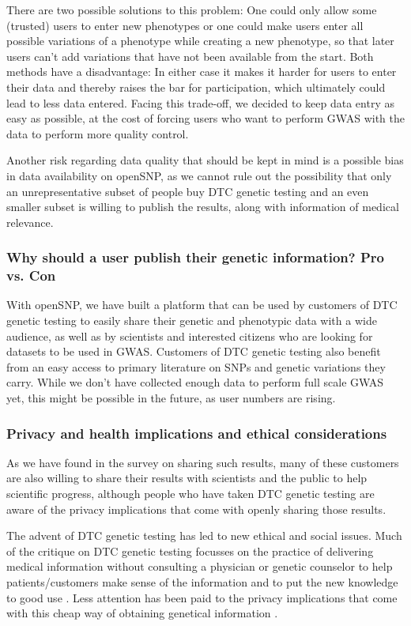 \documentclass[10pt]{article}
\begin{document}
There are two possible solutions to this problem: One could only allow some (trusted) users to enter new phenotypes or one could make users enter all possible variations of a phenotype while creating a new phenotype, so that later users can't add variations that have not been available from the start. Both methods have a disadvantage: In either case it makes it harder for users to enter their data and thereby raises the bar for participation, which ultimately could lead to less data entered. Facing this trade-off, we decided to keep data entry as easy as possible, at the cost of forcing users who want to perform GWAS with the data to perform more quality control.

Another risk regarding data quality that should be kept in mind is a possible bias in data availability on openSNP, as we cannot rule out the possibility that only an unrepresentative subset of people buy DTC genetic testing and an even smaller subset is willing to publish the results, along with information of medical relevance.
\subsubsection*{Why should a user publish their genetic information? Pro vs. Con}
With openSNP, we have built a platform that can be used by customers of DTC genetic testing to easily share their genetic and phenotypic data with a wide audience, as well as by scientists and interested citizens who are looking for datasets to be used in GWAS. Customers of DTC genetic testing also benefit from an easy access to primary literature on SNPs and genetic variations they carry. While we don't have collected enough data to perform full scale GWAS yet, this might be possible in the future, as user numbers are rising. 
\subsubsection*{Privacy and health implications and ethical considerations}

As we have found in the survey on sharing such results, many of these customers are also willing to share their results with scientists and the public to help scientific progress, although people who have taken DTC genetic testing are aware of the privacy implications that come with openly sharing those results.      

The advent of DTC genetic testing has led to new ethical and social issues. Much of the critique on DTC genetic testing focusses on the practice of delivering medical information without consulting a physician or genetic counselor to help patients/customers make sense of the information and to put the new knowledge to good use \cite{Hauskeller2011,Hogarth2008,Wasson2009}. Less attention has been paid to the privacy implications that come with this cheap way of obtaining genetical information \cite{Caulfield2011,Joh2011}. 
\end{document}
